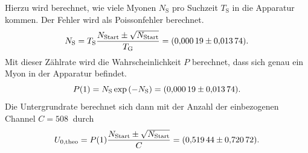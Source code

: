 Hierzu wird berechnet, wie viele Myonen $N_{\text{S}}$ pro Suchzeit $T_{\text{S}}$ in die Apparatur kommen. Der Fehler wird als Poissonfehler berechnet.
\begin{equation*}
  N_{\text{S}} = T_{\text{S}}\frac{N_{\text{Start}} \pm \sqrt{ N_{\text{Start}}} }{T_{\text{G}}} = \SI{0.00019 \pm 0.01374}{}.
\end{equation*}
Mit dieser Zählrate wird die Wahrscheinlichkeit $P$ berechnet, dass sich genau ein Myon in der Apparatur befindet.
\begin{equation*}
  P(1) = N_{\text{S}} \exp{(-N_{\text{S}})} = \SI{0.00019 \pm 0.01374}{}.
\end{equation*}
Die Untergrundrate berechnet sich dann mit der Anzahl der einbezogenen Channel $C=\SI{508}{}$ durch
\begin{equation*}
  U_{\text{0,theo}}= P(1) \frac{ N_{\text{Start}} \pm \sqrt{ N_{\text{Start}} }}{C} = \SI{0.51944 \pm 0.72072}{}.
\end{equation*}
\FloatBarrier
